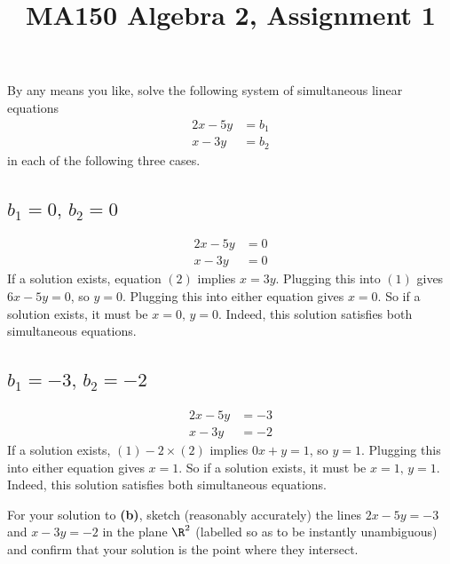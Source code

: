 \documentclass[a4paper]{article}
\title{MA150 Algebra 2, Assignment 1}
\begin{document}
\maketitle

\setlength{\parindent}{0em}
\setlength{\parskip}{1em}


\begin{questionbody}
By any means you like, solve the following system of simultaneous linear equations
\begin{align*}
2x - 5y &= b_1 \\
x - 3y &= b_2
\end{align*}
in each of the following three cases.
\end{questionbody}

\subsection{$b_1 = 0,\, b_2 = 0$} %

\begin{align*}
2x - 5y &= 0 \tag{1} \\
x - 3y &= 0 \tag{2}
\end{align*}
If a solution exists, equation $(2)$ implies $x = 3y$. Plugging this into $(1)$ gives $6x - 5y = 0$, so $y=0$. Plugging this into either equation gives $x=0$.
So if a solution exists, it must be $x=0,\, y=0$. Indeed, this solution satisfies both simultaneous equations.

\subsection{$b_1 = -3,\, b_2 = -2$} %

\begin{align*}
2x - 5y &= -3 \tag{1} \\
x - 3y &= -2 \tag{2}
\end{align*}
If a solution exists, $(1) - 2 \times (2)$ implies $0x + y = 1$, so $y=1$. Plugging this into either equation gives $x=1$.
So if a solution exists, it must be $x=1,\, y=1$. Indeed, this solution satisfies both simultaneous equations.

\begin{questionbody}
For your solution to \textbf{(b)}, sketch (reasonably accurately) the lines $2x - 5y = -3$ and
$x - 3y = -2$ in the plane $\R^2$ (labelled so as to be instantly unambiguous) and confirm
that your solution is the point where they intersect.
\end{questionbody}
\end{document}
